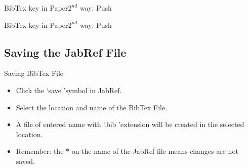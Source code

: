 \documentclass [9pt] {beamer}
\begin{document}
\begin{frame}{BibTex key in Paper}{$2^{nd}$ way: Push}

\begin{figure}
\end{figure}

\end{frame}

\begin{frame}{BibTex key in Paper}{$2^{nd}$ way: Push}

\begin{figure}
\end{figure}

\end{frame}

\subsection{Saving the JabRef File}
\begin{frame}{Saving BibTex File}%
\begin{itemize}
\item Click the \lq save \rq symbol in JabRef.
\item Select the location and name of the BibTex File.
\item A file of entered name with \lq .bib \rq extension will be created in the selected location.
\item Remember: the $*$ on the name of the JabRef file means changes are not saved.
\end{itemize}

\end{frame}
\end{document}
